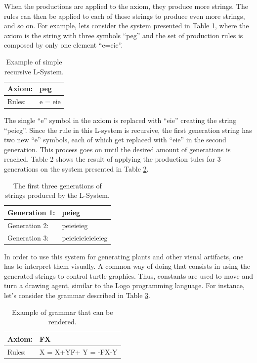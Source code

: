 \documentclass{article}
\begin{document}
When the productions are applied to the axiom, they produce more strings. The rules can then be applied
to each of those strings to produce even more strings, and so on. For example, lets consider the system presented
in Table \ref{tab:example1}, where the axiom is the string with three symbols ``peg'' and the set of production
rules is composed by only one element ``e=eie''.

\begin{table}[!h]
\centering
\begin{tabular}{|l|l|}
\hline
Axiom: & peg     \\ \hline
Rules: & e = eie \\ \hline
\end{tabular}
\caption{Example of simple recursive L-System.}
\label{tab:example1}
\end{table}

The single ``e'' symbol in the axiom is replaced with ``eie'' creating the string ``peieg''.
Since the rule in this L-system is recursive, the first generation string has two new ``e''
symbols, each of which get replaced with  ``eie'' in the second generation. This process goes
on until the desired amount of generations is reached. Table 2 shows the result of applying
the production tules for 3 generations on the system presented in Table \ref{tab:example2}.

\begin{table}[]
\centering
\begin{tabular}{|l|l|}
\hline
Generation 1: & peieg             \\ \hline
Generation 2: & peieieieg         \\ \hline
Generation 3: & peieieieieieieieg \\ \hline
\end{tabular}
\caption{The first three generations of strings produced by the L-System.}
\label{tab:example2}
\end{table}

In order to use this system for generating plants and other visual artifacts, one
has to interpret them visually. A common way of doing that consists in using
the generated strings to control turtle graphics. Thus, constants are
used to move and turn a drawing agent, similar to the Logo programming language.
For instance, let's consider the grammar described in Table \ref{tab:example3}.

\begin{table}[!h]
\centering
\begin{tabular}{|l|p{25mm}|}
\hline
Axiom: & FX        \\ \hline
Rules: & X = X+YF+ \newline Y = -FX-Y \\ \hline
\end{tabular}
\caption{Example of grammar that can be rendered.}
\label{tab:example3}
\end{table}
\end{document}
